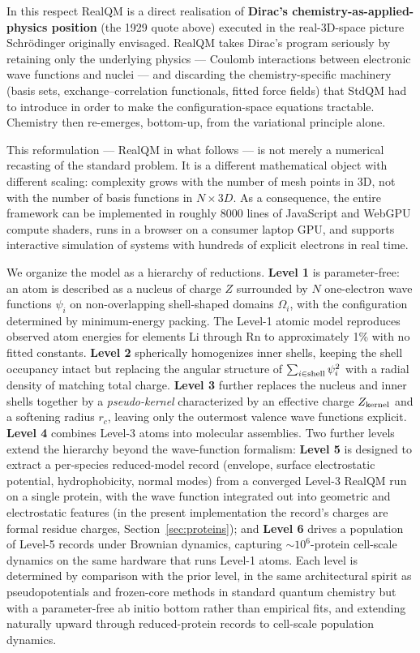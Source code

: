\documentclass[11pt]{article}
\begin{document}
In this respect RealQM is a direct realisation of \textbf{Dirac's chemistry-as-applied-physics position} (the 1929 quote above) executed in the real-3D-space picture Schr\"odinger originally envisaged. RealQM takes Dirac's program seriously by retaining only the underlying physics --- Coulomb interactions between electronic wave functions and nuclei --- and discarding the chemistry-specific machinery (basis sets, exchange--correlation functionals, fitted force fields) that StdQM had to introduce in order to make the configuration-space equations tractable. Chemistry then re-emerges, bottom-up, from the variational principle alone.

This reformulation --- RealQM in what follows --- is not merely a numerical recasting of the standard problem. It is a different mathematical object with different scaling: complexity grows with the number of mesh points in 3D, not with the number of basis functions in $N \times 3D$. As a consequence, the entire framework can be implemented in roughly 8000 lines of JavaScript and WebGPU compute shaders, runs in a browser on a consumer laptop GPU, and supports interactive simulation of systems with hundreds of explicit electrons in real time.

We organize the model as a hierarchy of reductions. \textbf{Level 1} is parameter-free: an atom is described as a nucleus of charge $Z$ surrounded by $N$ one-electron wave functions $\psi_i$ on non-overlapping shell-shaped domains $\Omega_i$, with the configuration determined by minimum-energy packing. The Level-1 atomic model reproduces observed atom energies for elements Li through Rn to approximately 1\% with no fitted constants. \textbf{Level 2} spherically homogenizes inner shells, keeping the shell occupancy intact but replacing the angular structure of $\sum_{i \in {\rm shell}} \psi_i^2$ with a radial density of matching total charge. \textbf{Level 3} further replaces the nucleus and inner shells together by a \emph{pseudo-kernel} characterized by an effective charge $Z_{\rm kernel}$ and a softening radius $r_c$, leaving only the outermost valence wave functions explicit. \textbf{Level 4} combines Level-3 atoms into molecular assemblies. Two further levels extend the hierarchy beyond the wave-function formalism: \textbf{Level 5} is designed to extract a per-species reduced-model record (envelope, surface electrostatic potential, hydrophobicity, normal modes) from a converged Level-3 RealQM run on a single protein, with the wave function integrated out into geometric and electrostatic features (in the present implementation the record's charges are formal residue charges, Section~\ref{sec:proteins}); and \textbf{Level 6} drives a population of Level-5 records under Brownian dynamics, capturing $\sim 10^6$-protein cell-scale dynamics on the same hardware that runs Level-1 atoms. Each level is determined by comparison with the prior level, in the same architectural spirit as pseudopotentials and frozen-core methods in standard quantum chemistry but with a parameter-free ab initio bottom rather than empirical fits, and extending naturally upward through reduced-protein records to cell-scale population dynamics.
\end{document}
